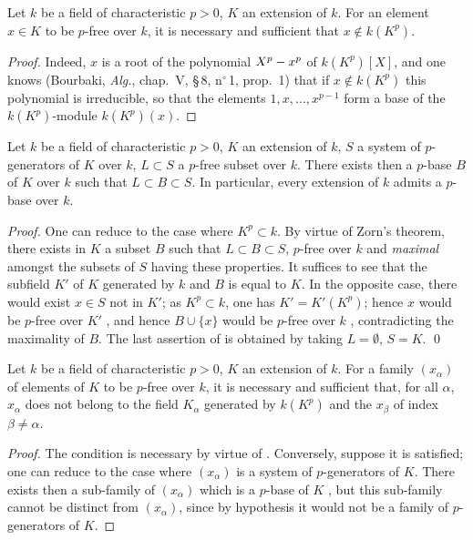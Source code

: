 \begin{lemma}[21.4.1]
\label{0.21.4.1}
Let $k$ be a field of characteristic $p>0$, $K$ an extension of $k$.
For an element $x\in K$ to be $p$-free over $k$, it is necessary and sufficient that $x\notin k(K^p)$.
\end{lemma}

\begin{proof}
Indeed, $x$ is a root of the polynomial $X^p- x^p$ of $k(K^p)[X]$, and one knows (Bourbaki, \emph{Alg.}, chap.~V, \S\,8, n$^\circ$\,1, prop.~1) that if $x\notin k(K^p)$ this polynomial is irreducible, so that the elements $1,x,\ldots,x^{p-1}$ form a base of the $k(K^p)$-module $k(K^p)(x)$.
\end{proof}

\begin{theorem}[21.4.2]
\label{0.21.4.2}
Let $k$ be a field of characteristic $p>0$, $K$ an extension of $k$, $S$ a system of $p$-generators of $K$ over $k$, $L\subset S$ a $p$-free subset over $k$.
There exists then a $p$-base $B$ of $K$ over $k$ such that $L\subset B\subset S$.
In particular, every extension of $k$ admits a $p$-base over $k$.
\end{theorem}

\begin{proof}
One can reduce to the case where $K^p\subset k$.
By virtue of Zorn's theorem, there exists in $K$ a subset $B$ such that $L\subset B\subset S$, $p$-free over $k$ and \emph{maximal} amongst the subsets of $S$ having these properties.
It suffices to see that the subfield $K'$ of $K$ generated by $k$ and $B$ is equal to $K$.
In the opposite case, there would exist $x\in S$ not in $K'$; as $K^p\subset k$, one has $K'=K'(K^p)$; hence $x$ would be $p$-free over $K'$ , and hence $B\cup\{x\}$ would be $p$-free over $k$ , contradicting the maximality of $B$.
The last assertion of  is obtained by taking $L=\emptyset$, $S=K$.
\qed
\end{proof}

\begin{corollary}[21.4.3]
\label{0.21.4.3}
Let $k$ be a field of characteristic $p>0$, $K$ an extension of $k$.
For a family $(x_\alpha)$ of elements of $K$ to be $p$-free over $k$, it is necessary and sufficient that, for all $\alpha$, $x_\alpha$ does not belong to the field $K_\alpha$ generated by $k(K^p)$ and the $x_\beta$ of index $\beta\neq\alpha$.
\end{corollary}

\begin{proof}
The condition is necessary by virtue of .
Conversely, suppose it is satisfied; one can reduce to the case where $(x_\alpha)$ is a system of $p$-generators of $K$.
There exists then a sub-family of $(x_\alpha)$ which is a $p$-base of $K$ , but this sub-family cannot be distinct from $(x_\alpha)$, since by hypothesis it would not be a family of $p$-generators of $K$.
\end{proof}

